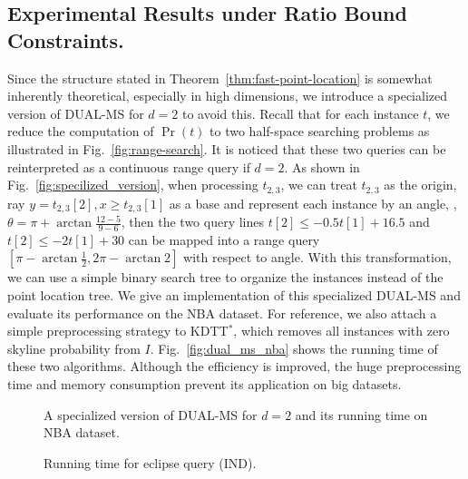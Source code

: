 \subsection{Experimental Results under Ratio Bound Constraints.}

Since the structure stated in Theorem~\ref{thm:fast-point-location} is somewhat inherently theoretical, especially in high dimensions, we introduce a specialized version of \textsc{DUAL-MS} for $d = 2$ to avoid this.
Recall that for each instance $t$, we reduce the computation of $\Pr(t)$ to two half-space searching problems as illustrated in Fig.~\ref{fig:range-search}. 
It is noticed that these two queries can be reinterpreted as a continuous range query if $d = 2$.
As shown in Fig.~\ref{fig:specilized_version}, when processing $t_{2, 3}$,  we can treat $t_{2, 3}$ as the origin, ray $y = t_{2, 3}[2], x \ge t_{2, 3}[1]$ as a base and represent each instance by an angle, \eg, $\theta = \pi + \arctan\frac{12 - 5}{9 - 6}$, then the two query lines $t[2] \le -0.5t[1] + 16.5$ and $t[2] \le -2t[1] + 30$ can be mapped into a range query $[\pi - \arctan\frac{1}{2}, 2\pi - \arctan2]$ with respect to angle.
With this transformation, we can use a simple binary search tree to organize the instances instead of the point location tree.
We give an implementation of this specialized \textsc{DUAL-MS} and evaluate its performance on the \textsc{NBA} dataset.
For reference, we also attach a simple preprocessing strategy to \textsc{KDTT$^*$}, which removes all instances with zero skyline probability from $I$.
Fig.~\ref{fig:dual_ms_nba} shows the running time of these two algorithms.
Although the efficiency is improved, the huge preprocessing time and memory consumption prevent its application on big datasets.

\begin{figure*}[t]
	\begin{minipage}{.39\textwidth}
        \centering
	   \caption{A specialized version of \textsf{DUAL-MS} for $d = 2$ and its running time on NBA dataset.}
	\end{minipage}
	\begin{minipage}{.6\textwidth}
        \centering
    	\caption{Running time for eclipse query (\textsc{IND}).}
    	\label{fig:eclipse}
    \end{minipage}
\end{figure*}


